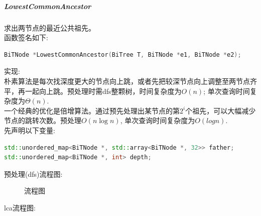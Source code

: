 \documentclass[supercite]{Experimental_Report}
\theoremstyle{definition}
\begin{document}
\subparagraph{LowestCommonAncestor}
\noindent
求出两节点的最近公共祖先。 \\
函数签名如下:
\begin{lstlisting}[language=C++, frame=single]
BiTNode *LowestCommonAncestor(BiTree T, BiTNode *e1, BiTNode *e2);
\end{lstlisting}
实现: \\
朴素算法是每次找深度更大的节点向上跳，或者先把较深节点向上调整至两节点齐平，再一起向上跳。预处理时需dfs整颗树，时间复杂度为$O(n)$; 单次查询时间复杂度为$\Theta(n)$. \\
一个经典的优化是倍增算法。通过预先处理出某节点的第$2^i$个祖先，可以大幅减少节点的跳转次数。预处理$O(n \log n)$, 单次查询时间复杂度为$O(log n)$. \\
先声明以下变量:
\begin{lstlisting}[language=C++, frame=single]
std::unordered_map<BiTNode *, std::array<BiTNode *, 32>> father;
std::unordered_map<BiTNode *, int> depth;
\end{lstlisting}
\newpage
\noindent
预处理(dfs)流程图:
\begin{figure}[H]
	\centering
	\centering
	\caption{流程图}
	\label{fig6-7}
\end{figure}
\clearpage
lca流程图:
\end{document}
